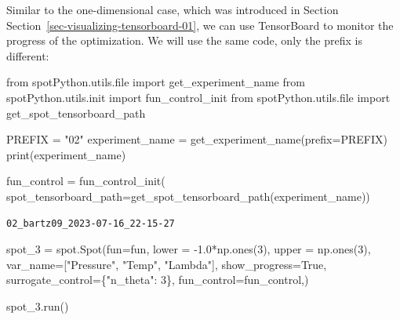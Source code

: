 \documentclass[
  letterpaper,
  DIV=11,
  numbers=noendperiod]{scrreprt}
\newenvironment{Shaded}{\begin{snugshade}}{\end{snugshade}}
\newcommand{\BuiltInTok}[1]{\textcolor[rgb]{0.00,0.23,0.31}{#1}}
\newcommand{\DecValTok}[1]{\textcolor[rgb]{0.68,0.00,0.00}{#1}}
\newcommand{\FloatTok}[1]{\textcolor[rgb]{0.68,0.00,0.00}{#1}}
\newcommand{\ImportTok}[1]{\textcolor[rgb]{0.00,0.46,0.62}{#1}}
\newcommand{\NormalTok}[1]{\textcolor[rgb]{0.00,0.23,0.31}{#1}}
\newcommand{\OperatorTok}[1]{\textcolor[rgb]{0.37,0.37,0.37}{#1}}
\newcommand{\StringTok}[1]{\textcolor[rgb]{0.13,0.47,0.30}{#1}}
\newcommand{\VariableTok}[1]{\textcolor[rgb]{0.07,0.07,0.07}{#1}}
\begin{document}
\begin{tcolorbox}[enhanced jigsaw, left=2mm, title=\textcolor{quarto-callout-note-color}{\faInfo}\hspace{0.5em}{TensorBoard}, titlerule=0mm, toprule=.15mm, leftrule=.75mm, colbacktitle=quarto-callout-note-color!10!white, colback=white, arc=.35mm, toptitle=1mm, bottomtitle=1mm, colframe=quarto-callout-note-color-frame, bottomrule=.15mm, rightrule=.15mm, breakable, coltitle=black, opacitybacktitle=0.6, opacityback=0]

Similar to the one-dimensional case, which was introduced in Section
Section~\ref{sec-visualizing-tensorboard-01}, we can use TensorBoard to
monitor the progress of the optimization. We will use the same code,
only the prefix is different:

\begin{Shaded}
\begin{Highlighting}[]
\ImportTok{from}\NormalTok{ spotPython.utils.}\BuiltInTok{file} \ImportTok{import}\NormalTok{ get\_experiment\_name}
\ImportTok{from}\NormalTok{ spotPython.utils.init }\ImportTok{import}\NormalTok{ fun\_control\_init}
\ImportTok{from}\NormalTok{ spotPython.utils.}\BuiltInTok{file} \ImportTok{import}\NormalTok{ get\_spot\_tensorboard\_path}

\NormalTok{PREFIX }\OperatorTok{=} \StringTok{"02"}
\NormalTok{experiment\_name }\OperatorTok{=}\NormalTok{ get\_experiment\_name(prefix}\OperatorTok{=}\NormalTok{PREFIX)}
\BuiltInTok{print}\NormalTok{(experiment\_name)}

\NormalTok{fun\_control }\OperatorTok{=}\NormalTok{ fun\_control\_init(}
\NormalTok{    spot\_tensorboard\_path}\OperatorTok{=}\NormalTok{get\_spot\_tensorboard\_path(experiment\_name))}
\end{Highlighting}
\end{Shaded}

\begin{verbatim}
02_bartz09_2023-07-16_22-15-27
\end{verbatim}

\end{tcolorbox}

\begin{Shaded}
\begin{Highlighting}[]
\NormalTok{spot\_3 }\OperatorTok{=}\NormalTok{ spot.Spot(fun}\OperatorTok{=}\NormalTok{fun,}
\NormalTok{                   lower }\OperatorTok{=} \OperatorTok{{-}}\FloatTok{1.0}\OperatorTok{*}\NormalTok{np.ones(}\DecValTok{3}\NormalTok{),}
\NormalTok{                   upper }\OperatorTok{=}\NormalTok{ np.ones(}\DecValTok{3}\NormalTok{),}
\NormalTok{                   var\_name}\OperatorTok{=}\NormalTok{[}\StringTok{"Pressure"}\NormalTok{, }\StringTok{"Temp"}\NormalTok{, }\StringTok{"Lambda"}\NormalTok{],}
\NormalTok{                   show\_progress}\OperatorTok{=}\VariableTok{True}\NormalTok{,}
\NormalTok{                   surrogate\_control}\OperatorTok{=}\NormalTok{\{}\StringTok{"n\_theta"}\NormalTok{: }\DecValTok{3}\NormalTok{\},}
\NormalTok{                   fun\_control}\OperatorTok{=}\NormalTok{fun\_control,)}

\NormalTok{spot\_3.run()}
\end{Highlighting}
\end{Shaded}
\end{document}
